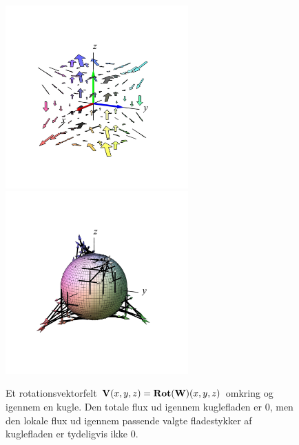 \begin{figure}[ht]
\centerline{\includegraphics[width=70mm]{FIGS/plotKugleFluxRot2}\includegraphics[width=70mm]{FIGS/plotKugleFluxRot3}}
\begin{center}
\caption{\small{Et rotationsvektorfelt $\mathbf{V}(x,y,z) = \operatorname{\mathbf{Rot}}(\mathbf{W})(x,y,z)$ omkring og igennem en kugle. Den totale flux ud igennem kuglefladen er $0$, men den lokale flux ud igennem passende valgte fladestykker af kuglefladen er tydeligvis ikke $0$.}} \label{figKugleFluxRot}
\end{center}
\end{figure}


